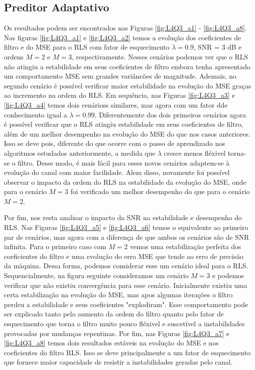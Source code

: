 \subsection{Preditor Adaptativo} %
Os resultados podem ser encontrados nas Figuras \ref{fig:L4Q3_a1} - \ref{fig:L4Q3_a8}. Nas figuras \ref{fig:L4Q3_a1} e \ref{fig:L4Q3_a2} temos a evolução
dos coeficientes de filtro e do MSE para o RLS com fator de esquecimento $\lambda = 0.9$, SNR = $3$ dB e ordens $M = 2$ e $M = 3$, respectivamente. Nesses cenários podemos 
ver que o RLS não atingiu a estabilidade em seus coeficientes de filtro embora tenha apresentado um comportamento MSE sem grandes variâncões de magnitude. Ademais, no segundo cenário
é possível verificar maior estabilidade na evolução do MSE graças ao incremento na ordem do RLS. Em sequência, nas Figuras \ref{fig:L4Q3_a3} e \ref{fig:L4Q3_a4} temos dois cenárioss similares, 
mas agora com um fator dde conhecimento igual a $\lambda = 0.99$. Diferentemente dos dois primeiros cenários agora é possível verificar que o RLS atingiu estabilidade em seus coeficientes de filtro, 
além de um melhor desempenho na evolução do MSE do que nos casos anteriores. Isso se deve pois, diferente do que ocorre com o passo de aprendizado nos algoritmos estudados anteriormente, a medida que
$\lambda$ cresce menos fléxivel torna-se o filtro. Desse modo, é mais fácil para esses novos cenários adaptem-se à evolução do canal com maior facilidade. Alem disso, novamente foi possível observar 
o impacto da ordem do RLS na estabilidade da evolução do MSE, onde para o cenário $M = 3$ foi verificado um melhor desempenho do que para o cenário $M = 2$.

Por fim, nos resta analisar o impacto da SNR na estabilidade e desempenho do RLS. Nas Figuras \ref{fig:L4Q3_a5} e \ref{fig:L4Q3_a6} temos o equivalente ao primeiro par de cenários, mas agora 
com a diferença de que ambos os cenários são de SNR infinita. Para o primeiro caso com $M = 2$ vemos uma estabilização perfeita dos coeficientes do filtro e uma evolução do erro MSE que tende ao erro de
precisão da máquina. Dessa forma, podemos considerar esse um cenário ideal para o RLS. Sequencialmente, na figura seguinte consideramos um cenário $M = 3$ e podemos verificar que não existiu convergência para
esse cenário. Inicialmente existiu uma certa estabilização na evolução do MSE, mas apos algumas iterações o filtro perdeu a estabilidade e seus coeficientes "explodiram". Esse comportamento pode ser explicado 
tanto pelo aumento da ordem do filtro quanto pelo fator de esquecimento que torna o filtro muito pouco fléxivel e suscetível a instabilidades provocadas por mudanças repentinas. Por fim, nas Figuras \ref{fig:L4Q3_a7}
e \ref{fig:L4Q3_a8} temos dois resultados estáveis na evolução do MSE e nos coeficientes do filtro RLS. Isso se deve principalmente a um fator de esquecimento que fornece maior capacidade de resistir a instabilidades
geradas pelo canal.


